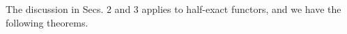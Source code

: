 The discussion in Secs. 2 and 3 applies to half-exact functors, and we have the following theorems.
